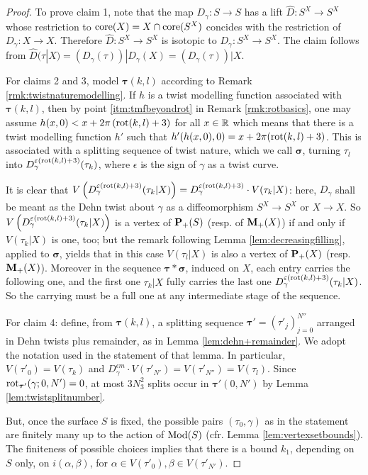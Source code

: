 \begin{proof}
To prove claim 1, note that the map $D_\gamma:S\rightarrow S$ has a lift $\hat D: S^X\rightarrow S^X$ whose restriction to $\mathrm{core}(X)=X\cap \mathrm{core}(S^X)$ concides with the restriction of $D_\gamma:X\rightarrow X$. Therefore $\hat D: S^X\rightarrow S^X$ is isotopic to $D_\gamma:S^X\rightarrow S^X$. The claim follows from $\hat D(\tau|X)=\left(D_\gamma(\tau)\right)|D_\gamma(X)=\left(D_\gamma(\tau)\right)|X$.

For claims 2 and 3, model $\bm\tau(k,l)$ according to Remark \ref{rmk:twistnaturemodelling}. If $h$ is a twist modelling function associated with $\bm\tau(k,l)$, then by point \ref{itm:tmfbeyondrot} in Remark \ref{rmk:rotbasics}, one may assume $h(x,0)<x+2\pi\left(\mathrm{rot}(k,l)+3\right)$ for all $x\in\mathbb R$ which means that there is a twist modelling function $h'$ such that $h'(h(x,0),0)=x+2\pi(\mathrm{rot}(k,l)+3)$. This is associated with a splitting sequence of twist nature, which we call $\bm\sigma$, turning $\tau_l$ into $D_\gamma^{\varepsilon(\mathrm{rot}(k,l)+3)}(\tau_k)$, where $\epsilon$ is the sign of $\gamma$ as a twist curve.

It is clear that $V\left(D_\gamma^{\varepsilon(\mathrm{rot}(k,l)+3)}(\tau_k|X)\right)= D_\gamma^{\varepsilon(\mathrm{rot}(k,l)+3)}\cdot V(\tau_k|X)$: here, $D_\gamma$ shall be meant as the Dehn twist about $\gamma$ as a diffeomorphism $S^X\rightarrow S^X$ or $X\rightarrow X$. So $V\left(D_\gamma^{\varepsilon(\mathrm{rot}(k,l)+3)}(\tau_k|X)\right)$ is a vertex of ${\mathbf{P}_+}(S)$ (resp. of ${\mathbf{M}_+}(X)$) if and only if $V(\tau_k|X)$ is one, too; but the remark following Lemma \ref{lem:decreasingfilling}, applied to $\bm\sigma$, yields that in this case $V(\tau_l|X)$ is also a vertex of ${\mathbf{P}_+}(X)$ (resp. ${\mathbf{M}_+}(X)$). Moreover in the sequence $\bm\tau*\bm\sigma$, induced on $X$, each entry carries the following one, and the first one $\tau_k|X$ fully carries the last one $D_\gamma^{\varepsilon(\mathrm{rot}(k,l)+3)}(\tau_k|X)$. So the carrying must be a full one at any intermediate stage of the sequence.

For claim 4: define, from $\bm\tau(k,l)$, a splitting sequence $\bm\tau'=(\tau'_j)_{j=0}^{N''}$ arranged in Dehn twists plus remainder, as in Lemma \ref{lem:dehn+remainder}. We adopt the notation used in the statement of that lemma. In particular, $V(\tau'_0)=V(\tau_k)$ and $D_\gamma^{\epsilon m}\cdot V(\tau'_{N'})=V(\tau'_{N''})=V(\tau_l)$. Since $\mathrm{rot}_{\bm\tau'}(\gamma;0,N')=0$, at most $3N_3^2$ splits occur in $\bm\tau'(0,N')$ by Lemma \ref{lem:twistsplitnumber}.

But, once the surface $S$ is fixed, the possible pairs $(\tau_0,\gamma)$ as in the statement are finitely many up to the action of $\mathrm{Mod}(S)$ (cfr. Lemma \ref{lem:vertexsetbounds}). The finiteness of possible choices implies that there is a bound $k_1$, depending on $S$ only, on $i(\alpha,\beta)$, for $\alpha\in V(\tau'_0),\beta\in V(\tau'_{N'})$. 


\end{proof}
